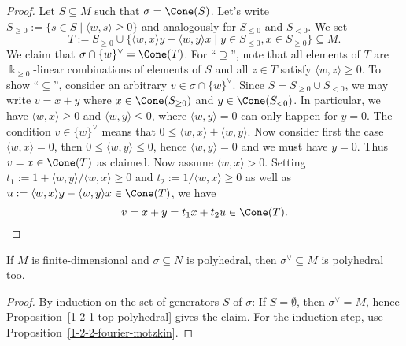 \begin{proof}
  \leanok
  Let \( S \subseteq M \) such that \( \sigma = \Cone(S) \). Let's
  write \( S_{\geq 0} := \{s \in S \mid \langle w, s \rangle \geq 0 \}
  \) and analogously for \( S_{\leq 0} \) and \( S_{<0} \). We set
  \[
      T := S_{\geq 0} \cup \{\langle w,x \rangle y - \langle w,y
      \rangle x \mid y \in S_{\leq 0}, x \in S_{\geq 0} \} \subseteq
      M.
  \]
  We claim that \( \sigma \cap \{w\}^\vee = \Cone(T) \). For ``\(
  \supseteq \)'', note that all elements of \( T \) are \( \Bbbk_{\geq
  0} \)-linear combinations of elements of \( S \) and all \( z \in T
  \) satisfy \( \langle w,z \rangle \geq 0 \). To show ``\( \subseteq
  \)'', consider an arbitrary \( v \in \sigma \cap \{w\}^\vee \).
  Since \( S = S_{\geq 0} \cup S_{<0} \), we may write \( v = x + y \)
  where \( x \in \Cone(S_{\geq 0}) \) and \( y \in \Cone(S_{<0}) \).
  In particular, we have \( \langle w,x \rangle \geq 0 \) and \(
  \langle w,y \rangle \leq 0 \), where \( \langle w,y \rangle = 0 \)
  can only happen for \( y = 0 \). The condition \( v \in \{w\}^\vee
  \) means that \(0 \leq \langle w,x \rangle + \langle w,y \rangle \).
  Now consider first the case \( \langle w,x \rangle = 0 \), then \( 0
  \leq \langle w,y \rangle \leq 0 \), hence \( \langle w,y \rangle = 0 \)
  and we must have \( y = 0 \). Thus \( v = x \in \Cone(T) \) as
  claimed. Now assume \( \langle w,x \rangle > 0 \). Setting \( t_1 :=
  1 + \langle w,y \rangle / \langle w,x \rangle \geq 0\) and \( t_2 :=
  1 / \langle w,x \rangle \geq 0\) as well as \( u := \langle w,x
  \rangle y - \langle w,y\rangle x \in \Cone(T) \), we have
  \[
      v = x + y = t_1 x + t_2 u \in \Cone(T).
  \]
\end{proof}

\begin{proposition}
  \label{1-2-2-dual-polyhedral-cone}
  \leanok
  If \( M \) is finite-dimensional and \( \sigma \subseteq N \) is
  polyhedral, then \( \sigma^\vee \subseteq M \) is polyhedral too.
\end{proposition}
\begin{proof}
  \leanok
  By induction on the set of generators \( S \) of \( \sigma \): If \(
  S = \emptyset \), then \( \sigma^\vee = M \), hence
  Proposition~\ref{1-2-1-top-polyhedral} gives the claim. For the
  induction step, use Proposition~\ref{1-2-2-fourier-motzkin}.
\end{proof}


